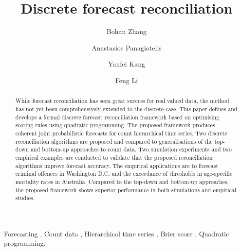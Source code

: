 \documentclass[a4paper,review,12pt,authoryear]{elsarticle}
\theoremstyle{definition}
\begin{document}
\begin{frontmatter}

  \title{Discrete forecast reconciliation}

  \author[label1]{Bohan Zhang}
  \address[label1]{School of Economics and Management, Beihang University, Beijing, China}
  \author[label2]{Anastasios Panagiotelis}
  \author[label1]{Yanfei Kang}

  \author[label3]{Feng Li}

  \address[label2]{The University of Sydney Business School, NSW 2006, Australia}
  \address[label3]{School of Statistics and Mathematics, Central University of Finance and Economics, Beijing, China}

  \begin{abstract}

    While forecast reconciliation has seen great success for real valued data, the method has not yet been comprehensively extended to the discrete case. This paper defines and develops a formal discrete forecast reconciliation framework based on optimising scoring rules using quadratic programming. The proposed framework produces coherent joint probabilistic forecasts for count hierarchical time series.
    Two discrete reconciliation algorithms are proposed and compared to generalisations of the top-down and bottom-up approaches to count data. Two simulation experiments and two empirical examples are conducted to validate that the proposed reconciliation algorithms improve forecast accuracy. The empirical applications are to forecast  criminal offences in Washington D.C. and the exceedance of thresholds in age-specific mortality rates in Australia. Compared to the top-down and bottom-up approaches, the proposed framework shows superior performance in both simulations and empirical studies.

  \end{abstract}

  \begin{keyword}
  Forecasting \sep
  Count data \sep
  Hierarchical time series \sep
  Brier score \sep
  Quadratic programming.
  \end{keyword}

\end{frontmatter}

\newpage
\end{document}
